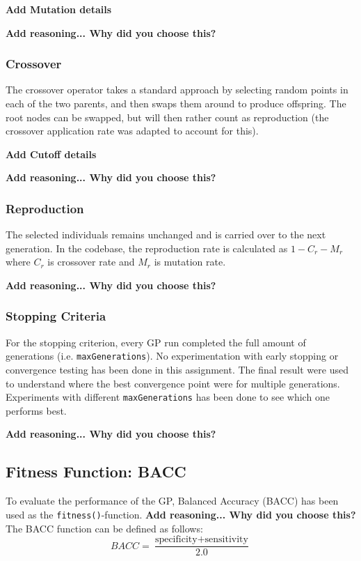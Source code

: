 \documentclass{article}
\begin{document}
\textbf{Add Mutation details}

\textbf{Add reasoning... Why did you choose this?}

\subsubsection{Crossover}
The crossover operator takes a standard approach by selecting random points in each of the two parents, and then swaps them around to produce offspring. The root nodes can be swapped, but will then rather count as reproduction (the crossover application rate was adapted to account for this).

\textbf{Add Cutoff details}

\textbf{Add reasoning... Why did you choose this?}

\subsubsection{Reproduction}
The selected individuals remains unchanged and is carried over to the next generation. In the codebase, the reproduction rate is calculated as \(1-C_r-M_r\) where \(C_r\) is crossover rate and \(M_r\) is mutation rate.

\textbf{Add reasoning... Why did you choose this?}

\subsubsection{Stopping Criteria}
For the stopping criterion, every GP run completed the full amount of generations (i.e. \texttt{maxGenerations}). No experimentation with early stopping or convergence testing has been done in this assignment. The final result were used to understand where the best convergence point were for multiple generations. Experiments with different \texttt{maxGenerations} has been done to see which one performs best.

\textbf{Add reasoning... Why did you choose this?}

\subsection{Fitness Function: BACC}
\label{fitness}
To evaluate the performance of the GP, Balanced Accuracy (BACC) has been used as the \texttt{fitness()}-function. \textbf{Add reasoning... Why did you choose this?} The BACC function can be defined as follows:
\begin{equation}\label{BACC}
  BACC = \frac{\mbox{specificity} + \mbox{sensitivity}}{2.0}
\end{equation}
\end{document}
